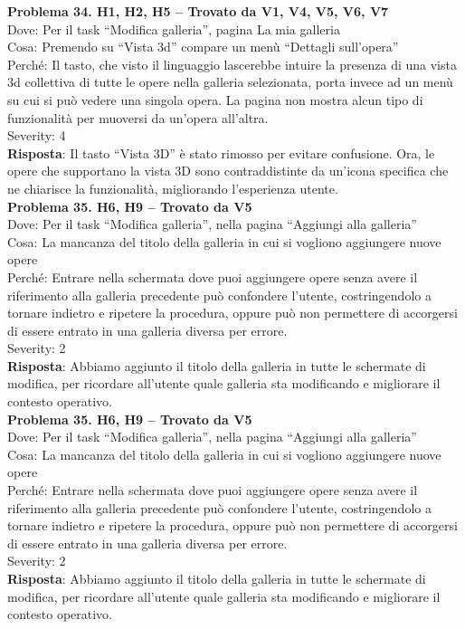 \documentclass{article}
\begin{document}
\noindent \textbf{Problema 34. H1, H2, H5 – Trovato da V1, V4, V5, V6, V7} \\
Dove: Per il task “Modifica galleria”, pagina La mia galleria \\
Cosa: Premendo su “Vista 3d” compare un menù “Dettagli sull’opera” \\
Perché: Il tasto, che visto il linguaggio lascerebbe intuire la presenza di una vista 3d collettiva di tutte le opere nella galleria selezionata, porta invece ad un menù su cui si può vedere una singola opera. La pagina non mostra alcun tipo di funzionalità per muoversi da un’opera all’altra. \\
Severity: 4 \\
\textbf{Risposta}: Il tasto “Vista 3D” è stato rimosso per evitare confusione. Ora, le opere che supportano la vista 3D sono contraddistinte da un’icona specifica che ne chiarisce la funzionalità, migliorando l’esperienza utente.\\

\noindent \textbf{Problema 35. H6, H9 – Trovato da V5} \\
Dove: Per il task “Modifica galleria”, nella pagina “Aggiungi alla galleria” \\
Cosa: La mancanza del titolo della galleria in cui si vogliono aggiungere nuove opere \\
Perché: Entrare nella schermata dove puoi aggiungere opere senza avere il riferimento alla galleria precedente può confondere l’utente, costringendolo a tornare indietro e ripetere la procedura, oppure può non permettere di accorgersi di essere entrato in una galleria diversa per errore. \\
Severity: 2 \\
\textbf{Risposta}: Abbiamo aggiunto il titolo della galleria in tutte le schermate di modifica, per ricordare all’utente quale galleria sta modificando e migliorare il contesto operativo.\\

\noindent \textbf{Problema 35. H6, H9 – Trovato da V5} \\
Dove: Per il task “Modifica galleria”, nella pagina “Aggiungi alla galleria” \\
Cosa: La mancanza del titolo della galleria in cui si vogliono aggiungere nuove opere \\
Perché: Entrare nella schermata dove puoi aggiungere opere senza avere il riferimento alla galleria precedente può confondere l’utente, costringendolo a tornare indietro e ripetere la procedura, oppure può non permettere di accorgersi di essere entrato in una galleria diversa per errore. \\
Severity: 2 \\
\textbf{Risposta}: Abbiamo aggiunto il titolo della galleria in tutte le schermate di modifica, per ricordare all’utente quale galleria sta modificando e migliorare il contesto operativo.\\
\end{document}
